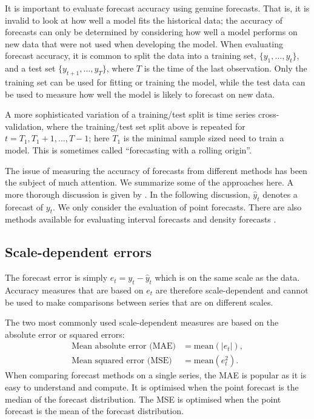 \documentclass[a4paper,10pt]{article}
\def\mean{\text{mean}}
\begin{document}
It is important to evaluate forecast accuracy using genuine forecasts. That is, it is invalid to look at how well a model fits the historical data; the accuracy of forecasts can only be determined by considering how well a model performs on new data that were not used when developing the model. When evaluating forecast accuracy, it is common to split the data into a training set, $\{y_1,\dots,y_t\}$, and a test set $\{y_{t+1}, \dots, y_{T}\}$, where $T$ is the time of the last observation. Only the training set can be used for fitting or training the model, while the test data can be used to measure how well the model is likely to forecast on new data.

A more sophisticated variation of a training/test split is time series cross-validation, where the training/test set split above is repeated for $t = T_1,T_1+1,\dots,T-1$; here $T_1$ is the minimal sample sized need to train a model. This is sometimes called ``forecasting with a rolling origin''.

The issue of measuring the accuracy of forecasts from different methods has been the subject of much attention. We summarize some of the approaches here. A more thorough discussion is given by \citet{HK06}. In the following discussion, $\hat{y}_t$ denotes a forecast of $y_t$. We only consider the evaluation of point forecasts. There are also methods available for evaluating interval forecasts and density forecasts \citep{fpp3}.

\subsection*{Scale-dependent errors}

The forecast error is simply $e_t=y_t-\hat{y}_{t}$ which is on the same scale as the data. Accuracy measures that are based on $e_t$ are therefore scale-dependent and cannot be used to make comparisons between series that are on different scales.

The two most commonly used scale-dependent measures are based on the absolute error or squared errors:
\begin{align*}
  \text{Mean absolute error (MAE)} & = \mean(|e_{t}|), \\
  \text{Mean squared error (MSE)}  & = \mean(e_{t}^2).
\end{align*}
When comparing forecast methods on a single series, the MAE is popular as it is easy to understand and compute. It is optimised when the point forecast is the median of the forecast distribution. The MSE is optimised when the point forecast is the mean of the forecast distribution.
\end{document}
